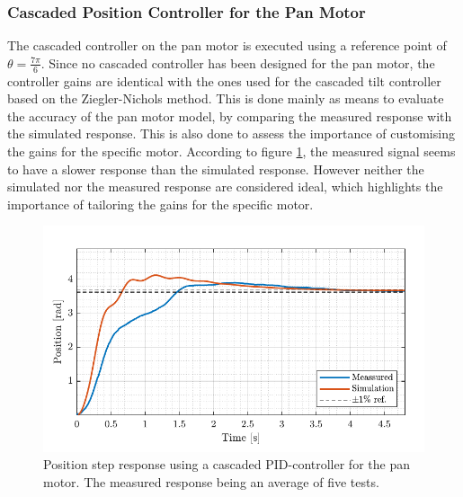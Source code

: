 \documentclass[../../main.tex]{subfiles}
\begin{document}
\subsubsection*{Cascaded Position Controller for the Pan Motor}
The cascaded controller on the pan motor is executed using a reference point of $\theta = \frac{7\pi}{6}$. Since no cascaded controller has been designed for the pan motor, the controller gains are identical with the ones used for the cascaded tilt controller based on the Ziegler-Nichols method. This is done mainly as means to evaluate the accuracy of the pan motor model, by comparing the measured response with the simulated response. This is also done to assess the importance of customising the gains for the specific motor.
According to figure \ref{fig:cascade_ZN_pan}, the measured signal seems to have a slower response than the simulated response. However neither the simulated nor the measured response are considered ideal, which highlights the importance of tailoring the gains for the specific motor.

\begin{figure}[H]
    \centering
    \includegraphics[width = 0.7 \textwidth]{Sections/Test/Images/CascadePanTest.pdf}
    \caption{Position step response using a cascaded PID-controller for the pan motor. The measured response being an average of five tests.}
    \label{fig:cascade_ZN_pan}
\end{figure}
\end{document}
